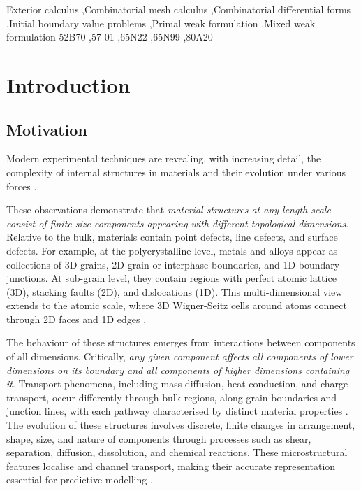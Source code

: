 \documentclass{elsarticle}
\theoremstyle{definition}
\begin{document}
\begin{frontmatter}
\begin{keyword}
Exterior calculus \sep Combinatorial mesh calculus \sep Combinatorial differential forms \sep Initial boundary value problems \sep Primal weak formulation \sep Mixed weak formulation
\MSC[2010] 52B70 \sep 57-01 \sep 65N22 \sep 65N99 \sep 80A20
\end{keyword}

\end{frontmatter}

\section{Introduction}

\subsection{Motivation}
\label{sec:introduction/motivation}

\noindent Modern experimental techniques are revealing, with increasing detail, the complexity of internal structures in materials \cite{kumar2023MC,hayashi2024MC} and their evolution under various forces \cite{stock2020XCT,woodruff2021SCT}.

These observations demonstrate that \textit{material structures at any length scale consist of finite-size components appearing with different topological dimensions}. Relative to the bulk, materials contain point defects, line defects, and surface defects. For example, at the polycrystalline level, metals and alloys appear as collections of 3D grains, 2D grain or interphase boundaries, and 1D boundary junctions. At sub-grain level, they contain regions with perfect atomic lattice (3D), stacking faults (2D), and dislocations (1D). This multi-dimensional view extends to the atomic scale, where 3D Wigner-Seitz cells around atoms connect through 2D faces and 1D edges \cite{hunklinger2022SSP}.

The behaviour of these structures emerges from interactions between components of all dimensions. Critically, \textit{any given component affects all components of lower dimensions on its boundary and all components of higher dimensions containing it}. Transport phenomena, including mass diffusion, heat conduction, and charge transport, occur differently through bulk regions, along grain boundaries and junction lines, with each pathway characterised by distinct material properties \cite{trovalusci2016MSM,brancherie2017MSM}. The evolution of these structures involves discrete, finite changes in arrangement, shape, size, and nature of components through processes such as shear, separation, diffusion, dissolution, and chemical reactions. These microstructural features localise and channel transport, making their accurate representation essential for predictive modelling \cite{burczynski2022MSM,baniassadi2023MCM}.
\end{document}
